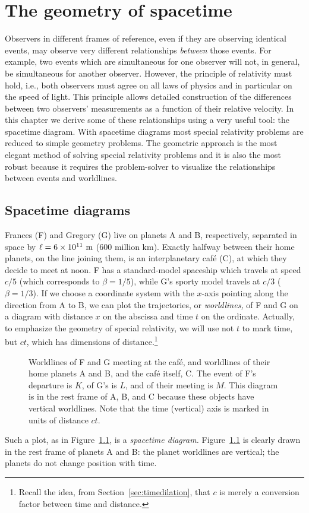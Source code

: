 \chapter{The geometry of spacetime}
\label{chap:geometry}

Observers in different frames of reference, even if they are observing
identical events, may observe very different relationships {\em
between\/} those events.  For example, two events which are
simultaneous for one observer will not, in general, be simultaneous
for another observer.  However, the principle of relativity must hold,
i.e., both observers must agree on all laws of physics and in
particular on the speed of light.  This principle allows detailed
construction of the differences between two observers' measurements as
a function of their relative velocity.  In this chapter we derive some
of these relationships using a very useful tool: the spacetime
diagram.  With spacetime diagrams most special relativity problems are
reduced to simple geometry problems.  The geometric approach is the
most elegant method of solving special relativity problems and it is
also the most robust because it requires the problem-solver to
visualize the relationships between events and worldlines.


\section{Spacetime diagrams}
\label{sec:sd}

Frances (F) and Gregory (G) live on planets A and B, respectively,
separated in space by $\ell=6\times 10^{11}~{\rm m}$ (600 million km).
Exactly halfway between their home planets, on the line joining them,
is an interplanetary caf\'e (C), at which they decide to meet at noon.
F has a standard-model spaceship which travels at speed $c/5$ (which
corresponds to $\beta=1/5$), while G's sporty model travels at $c/3$
($\beta=1/3$).  If we choose a coordinate system with the $x$-axis
pointing along the direction from A to B, we can plot the
trajectories, or {\em worldlines,\/} of F and G on a diagram with
distance $x$ on the abscissa and time $t$ on the ordinate.  Actually,
to emphasize the geometry of special relativity, we will use not $t$
to mark time, but $ct$, which has dimensions of
distance.\footnote{Recall the idea, from
Section~\ref{sec:timedilation}, that $c$ is merely a conversion factor
between time and distance.}
\begin{figure}
\caption[Worldlines of F and G meeting at the caf\'e]{Worldlines of F
and G meeting at the caf\'e, and worldlines of their home planets A
and B, and the caf\'e itself, C.  The event of F's departure is $K$,
of G's is $L$, and of their meeting is $M$.  This diagram is in the
rest frame of A, B, and C because these objects have vertical
worldlines.  Note that the time (vertical) axis is marked in units of
distance $ct$.}
\label{fig:cafe}
\end{figure}
Such a plot, as in Figure~\ref{fig:cafe}, is a {\em spacetime
diagram.\/} Figure~\ref{fig:cafe} is clearly drawn in the rest frame
of planets A and B: the planet worldlines are vertical; the planets do
not change position with time.

